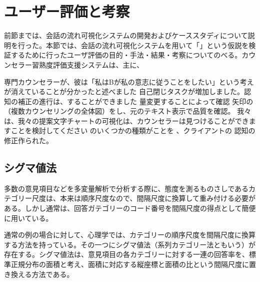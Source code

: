 \documentclass[shuuron]{kuee}
\begin{document}









\section{ユーザー評価と考察}

前節までは、会話の流れ可視化システムの開発およびケーススタディについて説明を行った。本節では、会話の流れ可視化システムを用いて「」という仮説を検証するために行ったユーザ評価の目的・手法・結果・考察についてのべる。カウンセラー習熟度評価支援システムは、主に、


  専門カウンセラーが、彼は「私はBが私の意志に従うことをしたい」という考えが消えていることが分かったと述べました
自己閉じタスクが増加しました。認知の補正の進行は、することができました 量変更することによって確認 矢印の（複数カウンセリングの全体図）をし、元のテキスト表示で品質を確認。 我々は、我々の提案文字チャートの可視化は、カウンセラーは見つけることができますことを検討してください のいくつかの種類がことを 、クライアントの 認知の修正作られた。
\subsection{シグマ値法}
多数の意見項目などを多変量解析で分析する際に、態度を測るものさしであるカテゴリー尺度は、本来は順序尺度なので、間隔尺度に換算して重み付ける必要がある。しかし通常は、回答ガテゴリーのコード番号を間隔尺度の得点として簡便に用いている。

通常の例の場合に対して、心理学では、カテゴリーの順序尺度を間隔尺度に換算する方法を持っている。その一つにシグマ値法（系列カテゴリー法ともいう）が存在する。シグマ値法は、意見項目の各カテゴリーに対する一連の回答率を、標準正規分布の面積と考え、面積に対応する縦座標と面積の比という間隔尺度に置き換える方法である。
\end{document}
